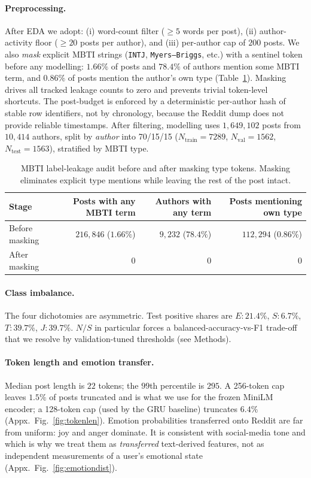 \documentclass{article}
\begin{document}
\paragraph{Preprocessing.} After EDA we adopt: (i) word-count filter ($\geq 5$ words per post), (ii) author-activity floor ($\geq 20$ posts per author), and (iii) per-author cap of $200$ posts. We also \emph{mask} explicit MBTI strings (\texttt{INTJ}, \texttt{Myers--Briggs}, etc.) with a sentinel token before any modelling: $1.66\%$ of posts and $78.4\%$ of authors mention some MBTI term, and $0.86\%$ of posts mention the author's own type (Table~\ref{tab:leakage}). Masking drives all tracked leakage counts to zero and prevents trivial token-level shortcuts. The post-budget is enforced by a deterministic per-author hash of stable row identifiers, not by chronology, because the Reddit dump does not provide reliable timestamps. After filtering, modelling uses $1{,}649{,}102$ posts from $10{,}414$ authors, split by \emph{author} into 70/15/15 ($N_{\text{train}}{=}7289$, $N_{\text{val}}{=}1562$, $N_{\text{test}}{=}1563$), stratified by MBTI type.

\begin{table}[t]
  \small
  \centering
  \caption{MBTI label-leakage audit before and after masking type tokens. Masking eliminates explicit type mentions while leaving the rest of the post intact.}
  \label{tab:leakage}
  \begin{tabular}{lrrr}
    \toprule
    Stage & Posts with any MBTI term & Authors with any term & Posts mentioning own type \\
    \midrule
    Before masking & $216{,}846$ ($1.66\%$) & $9{,}232$ ($78.4\%$) & $112{,}294$ ($0.86\%$) \\
    After masking  & $0$                    & $0$                  & $0$                    \\
    \bottomrule
  \end{tabular}
\end{table}

\paragraph{Class imbalance.} The four dichotomies are asymmetric. Test positive shares are $E{:}21.4\%$, $S{:}6.7\%$, $T{:}39.7\%$, $J{:}39.7\%$. $N/S$ in particular forces a balanced-accuracy-vs-F1 trade-off that we resolve by validation-tuned thresholds (see Methods).

\paragraph{Token length and emotion transfer.} Median post length is $22$ tokens; the $99$th percentile is $295$. A 256-token cap leaves $1.5\%$ of posts truncated and is what we use for the frozen MiniLM encoder; a 128-token cap (used by the GRU baseline) truncates $6.4\%$ (Appx.~Fig.~\ref{fig:tokenlen}). Emotion probabilities transferred onto Reddit are far from uniform: joy and anger dominate. It is consistent with social-media tone and which is why we treat them as \emph{transferred} text-derived features, not as independent measurements of a user's emotional state (Appx.~Fig.~\ref{fig:emotiondist}).
\end{document}
